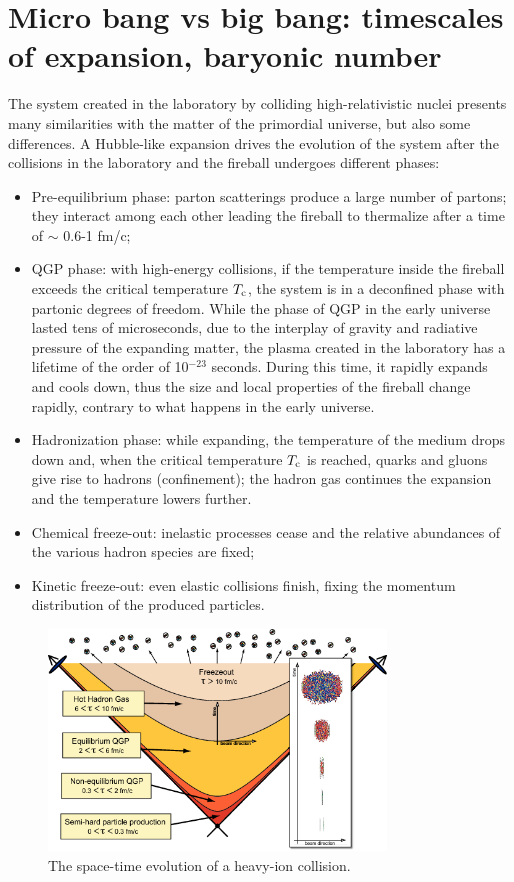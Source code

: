 \section{Micro bang vs big bang: timescales of expansion, baryonic number}
The system created in the laboratory by colliding
high-relativistic nuclei presents many similarities with 
the matter of the primordial universe, but also some differences. 
A Hubble-like expansion drives the 
evolution of the system after the collisions in the laboratory and the fireball undergoes different phases: 
\begin{itemize}
\item Pre-equilibrium phase: parton scatterings produce a large number of partons; 
they interact among each other leading the fireball to thermalize after a 
time of $\sim$ 0.6-1 fm/c;
\item QGP phase: with high-energy collisions, if the temperature inside the fireball 
exceeds the critical temperature $T_{\rm c}$, the system is in a deconfined 
phase with partonic degrees of freedom. While the phase of QGP in the early universe lasted
tens of microseconds, due to the interplay of gravity and
radiative pressure of the expanding matter, the plasma created in the laboratory 
has a lifetime of the order of 10$^{-23}$ seconds. During this time, it rapidly expands
and cools down, thus the size and local properties of
the fireball change rapidly, contrary to what happens in the 
early universe.

\item Hadronization phase: while expanding, the temperature 
of the medium drops down and, when the critical temperature $T_{\rm c}$
is reached, quarks and gluons give rise to hadrons (confinement); the hadron
gas continues the expansion and the temperature lowers further.

\item Chemical freeze-out: inelastic processes cease and the relative abundances of the various hadron species are fixed;
\item Kinetic freeze-out: even elastic collisions finish, fixing the momentum distribution of the produced particles. 
\end{itemize} 

\begin{figure}[h!]
\centering
 \includegraphics[width=0.8\textwidth] {FigCap1/timescales.png}
\caption{The space-time evolution of a heavy-ion collision. }
\label{fig:QCDphase}
\end{figure}


